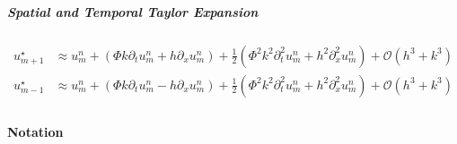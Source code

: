 \subparagraph{Spatial and Temporal Taylor Expansion}
\begin{align*}
  u_{m+1}^\star & \approx u_m^n + \left(\Phi k \partial_t u_m^n + h \partial_x u_m^n\right) + \frac{1}{2}\left(\Phi^2 k^2 \partial_t^2 u_m^n + h^2 \partial_x^2 u_m^n\right) + \mathcal{O}(h^3 + k^3) \\
  u_{m-1}^\star & \approx u_m^n + \left(\Phi k \partial_t u_m^n - h \partial_x u_m^n\right) + \frac{1}{2}\left(\Phi^2 k^2 \partial_t^2 u_m^n + h^2 \partial_x^2 u_m^n\right) + \mathcal{O}(h^3 + k^3) \\
\end{align*}


\paragraph{Notation}
